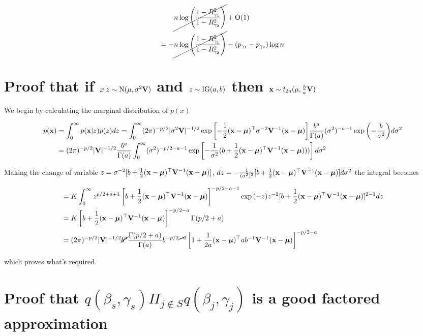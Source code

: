 \documentclass{amsart}[12pt]
\theoremstyle{definition}
\begin{document}
\begin{align*}
&\cancel{n \log \left(\frac{1 - R_{\gamma_1}^2}{1 - R_{\gamma_2}^2} \right)} + \text{O}(1) \\
=-&\cancel{n \log \left(\frac{1 - R_{\gamma_1}^2}{1 - R_{\gamma_2}^2} \right)} - (p_{\gamma_1} - p_{\gamma_2}) \log n
\end{align*}

\section{Proof that if $x|z \sim \text{N}(\mu, \sigma^2 {\bf V})$ and $z \sim \text{IG}(a, b)$ then ${\bf x} \sim t_{2a}(\mu, \frac{b}{a}{\bf V})$}

We begin by calculating the marginal distribution of $p(x)$

\begin{align*}
	p({\bf x}) &= \int_0^\infty p({\bf x}|z) p(z) dz = \int_0^\infty (2 \pi)^{-p/2} |\sigma^2 {\bf V}|^{-1/2} 
					\exp{\left[-\frac{1}{2}({\bf x}- {\boldsymbol\mu})^\top \sigma^{-2} {\bf V}^{-1} ({\bf x}- {\boldsymbol\mu}) \right]} 
					\frac{b^a}{\Gamma(a)} (\sigma^2)^{-a-1} \exp{\left(-\frac{b}{\sigma^2}\right)} d \sigma^2 \\
			&= (2 \pi)^{-p/2} |{\bf V}|^{-1/2} \frac{b^a}{\Gamma(a)} \int_0^\infty (\sigma^2)^{-p/2-a-1} \exp \left[-\frac{1}{\sigma^2} (b + \frac{1}{2} ({\bf x} - {\boldsymbol \mu})^\top {\bf V}^{-1} ({\bf x} - {\boldsymbol \mu}))) \right] d \sigma^2
\end{align*}

Making the change of variable $z = \sigma^{-2}[b + \frac{1}{2}({\bf x} - {\boldsymbol \mu})^\top {\bf V}^{-1} ({\bf x} - {\boldsymbol \mu})]$,
$dz = - \frac{1}{(\sigma^2)^2} [b + \frac{1}{2} ({\bf x} - {\boldsymbol \mu})^\top {\bf V}^{-1} ({\bf x} - {\boldsymbol \mu})] d \sigma^2$
the integral becomes

\begin{align*}
	&= K \int_0^\infty z^{p/2 + a + 1} \left[b + \frac{1}{2} ({\bf x} - {\boldsymbol \mu})^\top {\bf V}^{-1} ({\bf x} - {\boldsymbol \mu})\right]^{-p/2 -a - 1}
			\exp{(-z)} z^{-2} [b + \frac{1}{2} ({\bf x} - {\boldsymbol \mu})^\top {\bf V}^{-1} ({\bf x} - {\boldsymbol \mu})]^{2-1} dz \\
	&= K \left[b + \frac{1}{2} ({\bf x} - {\boldsymbol \mu})^\top {\bf V}^{-1} ({\bf x} - {\boldsymbol \mu})\right]^{-p/2 - a} \Gamma(p/2 + a) \\
	&= (2 \pi)^{-p/2} |{\bf V}|^{-1/2} \cancel{b^a} \frac{\Gamma(p/2 + a)}{\Gamma(a)} b^{-p/2 \cancel{- a}} \left[ 1 + \frac{1}{2a} ({\bf x} - {\boldsymbol \mu})^\top a b^{-1} {\bf V}^{-1} ({\bf x} - {\boldsymbol \mu}) \right]^{-p/2 - a}
\end{align*}

which proves what's required.

\section{Proof that $q(\beta_s, \gamma_s) \Pi_{j \notin S} q(\beta_j, \gamma_j)$ is a good factored approximation}
\end{document}
